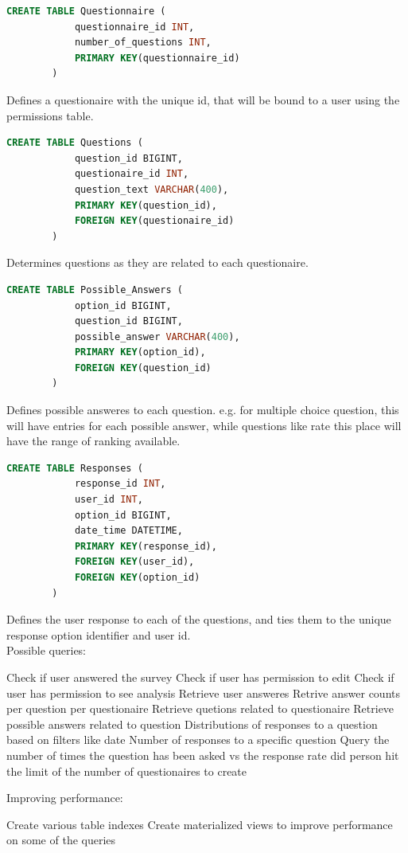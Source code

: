 \documentclass[12pt, oneside, a4paper]{article}
\begin{document}
    \begin{lstlisting}[language=SQL, columns=flexible]
        CREATE TABLE Questionnaire (
            questionnaire_id INT,
            number_of_questions INT, 
            PRIMARY KEY(questionnaire_id)
        ) 
    \end{lstlisting}
    Defines a questionaire with the unique id, that will be bound to a user using the permissions table. 
    \\

    \begin{lstlisting}[language=SQL, columns=flexible]
        CREATE TABLE Questions (
            question_id BIGINT,
            questionaire_id INT,
            question_text VARCHAR(400), 
            PRIMARY KEY(question_id),
            FOREIGN KEY(questionaire_id)
        ) 
    \end{lstlisting}
    Determines questions as they are related to each questionaire. 
    \\

    \begin{lstlisting}[language=SQL, columns=flexible]
        CREATE TABLE Possible_Answers (
            option_id BIGINT,
            question_id BIGINT, 
            possible_answer VARCHAR(400),
            PRIMARY KEY(option_id),
            FOREIGN KEY(question_id)
        ) 
    \end{lstlisting}
    Defines possible answeres to each question. e.g. for multiple choice question, this will have entries for each possible answer, while questions like rate this place will have the range of ranking available. 
    \\

    \begin{lstlisting}[language=SQL, columns=flexible]
        CREATE TABLE Responses (
            response_id INT,
            user_id INT,
            option_id BIGINT, 
            date_time DATETIME,
            PRIMARY KEY(response_id),
            FOREIGN KEY(user_id), 
            FOREIGN KEY(option_id)
        ) 
    \end{lstlisting}
    Defines the user response to each of the questions, and ties them to the unique response option identifier and user id.
    \\

    Possible queries: 
    \begin{outline}
        \1 Check if user answered the survey
        \1 Check if user has permission to edit 
        \1 Check if user has permission to see analysis
        \1 Retrieve user answeres
        \1 Retrive answer counts per question per questionaire
        \1 Retrieve quetions related to questionaire
        \1 Retrieve possible answers related to question
        \1 Distributions of responses to a question based on filters like date
        \1 Number of responses to a specific question
        \1 Query the number of times the question has been asked vs the response rate
        \1 did person hit the limit of the number of questionaires to create
    \end{outline}
    
    Improving performance:
    \begin{outline}
        \1 Create various table indexes
        \1 Create materialized views to improve performance on some of the queries
    \end{outline}
\end{document}

